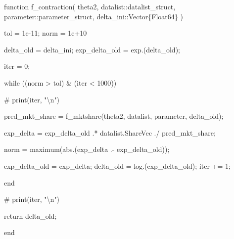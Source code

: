 \documentclass[
  letterpaper,
  DIV=11,
  numbers=noendperiod]{scrreprt}
\newenvironment{Shaded}{\begin{snugshade}}{\end{snugshade}}
\newcommand{\CommentTok}[1]{\textcolor[rgb]{0.37,0.37,0.37}{#1}}
\newcommand{\ControlFlowTok}[1]{\textcolor[rgb]{0.00,0.23,0.31}{#1}}
\newcommand{\DataTypeTok}[1]{\textcolor[rgb]{0.68,0.00,0.00}{#1}}
\newcommand{\FloatTok}[1]{\textcolor[rgb]{0.68,0.00,0.00}{#1}}
\newcommand{\FunctionTok}[1]{\textcolor[rgb]{0.28,0.35,0.67}{#1}}
\newcommand{\KeywordTok}[1]{\textcolor[rgb]{0.00,0.23,0.31}{#1}}
\newcommand{\NormalTok}[1]{\textcolor[rgb]{0.00,0.23,0.31}{#1}}
\newcommand{\OperatorTok}[1]{\textcolor[rgb]{0.37,0.37,0.37}{#1}}
\begin{document}
\begin{Shaded}
\begin{Highlighting}[]
\KeywordTok{function} \FunctionTok{f\_contraction}\NormalTok{(}
\NormalTok{        theta2,}
\NormalTok{        datalist}\OperatorTok{::}\DataTypeTok{datalist\_struct}\NormalTok{,}
\NormalTok{        parameter}\OperatorTok{::}\DataTypeTok{parameter\_struct}\NormalTok{,}
\NormalTok{        delta\_ini}\OperatorTok{::}\DataTypeTok{Vector\{Float64\}}
\NormalTok{    )}
    
\NormalTok{    tol }\OperatorTok{=} \FloatTok{1e{-}11}\NormalTok{;}
\NormalTok{    norm }\OperatorTok{=} \FloatTok{1e+10}

\NormalTok{    delta\_old }\OperatorTok{=}\NormalTok{ delta\_ini;}
\NormalTok{    exp\_delta\_old }\OperatorTok{=} \FunctionTok{exp}\NormalTok{.(delta\_old);}
    
\NormalTok{    iter }\OperatorTok{=} \FloatTok{0}\NormalTok{;}
        
    \ControlFlowTok{while}\NormalTok{ ((norm }\OperatorTok{\textgreater{}}\NormalTok{ tol) }\OperatorTok{\&}\NormalTok{ (iter }\OperatorTok{\textless{}} \FloatTok{1000}\NormalTok{))}
        
        \CommentTok{\# print(iter, "\textbackslash{}n")}
        
\NormalTok{        pred\_mkt\_share }\OperatorTok{=} \FunctionTok{f\_mktshare}\NormalTok{(theta2, datalist, parameter, delta\_old);}
        
\NormalTok{        exp\_delta }\OperatorTok{=}\NormalTok{ exp\_delta\_old }\OperatorTok{.*}\NormalTok{ datalist.ShareVec }\OperatorTok{./}\NormalTok{ pred\_mkt\_share;}
        
\NormalTok{        norm }\OperatorTok{=} \FunctionTok{maximum}\NormalTok{(}\FunctionTok{abs}\NormalTok{.(exp\_delta }\OperatorTok{.{-}}\NormalTok{ exp\_delta\_old));}
        
\NormalTok{        exp\_delta\_old }\OperatorTok{=}\NormalTok{ exp\_delta;}
\NormalTok{        delta\_old }\OperatorTok{=} \FunctionTok{log}\NormalTok{.(exp\_delta\_old);}
\NormalTok{        iter }\OperatorTok{+=} \FloatTok{1}\NormalTok{;}
        
    \ControlFlowTok{end}
    
\CommentTok{\#     print(iter, "\textbackslash{}n")}
    
    \ControlFlowTok{return}\NormalTok{ delta\_old;}
    
\KeywordTok{end}
\end{Highlighting}
\end{Shaded}
\end{document}
